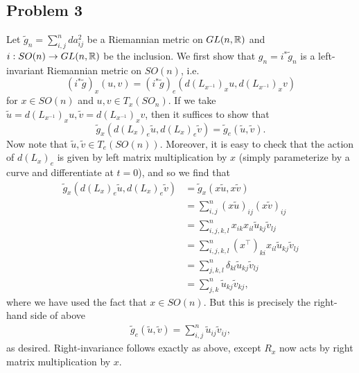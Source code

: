 \documentclass{../mathnotes}
\begin{document}
\subsection*{Problem 3}
Let $\tilde g_n=\sum_{i,j}^n da_{ij}^2$ be a Riemannian metric on $GL(n,\mathbb{R})$ and $i:SO(n)\to GL(n,\mathbb{R})$ be
the inclusion. We first show that $g_n=i^*\tilde g_n$ is a left-invariant Riemannian metric on $SO(n)$, i.e.
\[(i^*\tilde g)_x(u,v)=(i^*\tilde g)_e(d(L_{x^{-1}})_xu,d(L_{x^{-1}})_xv)\]
for $x\in SO(n)$ and $u,v\in T_x(SO_n)$. If we take $\tilde u=d(L_{x^{-1}})_xu,\tilde v=d(L_{x^{-1}})_xv$,
then it suffices to show that
\[\tilde g_x(d(L_x)_e\tilde u,d(L_x)_e\tilde v)=\tilde g_e(\tilde u,\tilde v).\]
Now note that $\tilde u,\tilde v\in T_e(SO(n))$. Moreover,
it is easy to check that the action of $d(L_x)_e$ is given by left matrix multiplication by $x$ (simply
parameterize by a curve and differentiate at $t=0$), and so we find that
\begin{align*}
    \tilde g_x(d(L_x)_e\tilde u,d(L_x)_e\tilde v) &= \tilde g_x(x\tilde u,x\tilde v)\\
    &=\sum_{i,j}^n(x\tilde u)_{ij}(x\tilde v)_{ij}\\
    &=\sum_{i,j,k,l}^nx_{ik}x_{il}\tilde u_{kj}\tilde v_{lj}\\
    &=\sum_{i,j,k,l}^n(x^\intercal)_{ki}x_{il}\tilde u_{kj}\tilde v_{lj}\\
    &=\sum_{j,k,l}^n\delta_{kl}\tilde u_{kj}\tilde v_{lj}\\
    &=\sum_{j,k}^n\tilde u_{kj}\tilde v_{kj},
\end{align*}
where we have used the fact that $x\in SO(n)$. But this is precisely the right-hand side of above
\begin{align*}
    \tilde g_e(\tilde u,\tilde v) = \sum_{i,j}^n \tilde u_{ij}\tilde v_{ij},
\end{align*}
as desired. Right-invariance follows exactly as above, except $R_x$ now acts by right matrix multiplication
by $x$.
\end{document}
